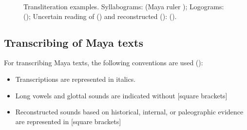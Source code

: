 \documentclass[../main.tex]{subfiles}
\begin{document}
\begin{figure}[ht]
    \centering
    \caption[Transliteration examples]{Transliteration examples.
             Syllabograms: 
            (Maya ruler );
             Logograms: 
             ();
             Uncertain reading of 
             () and reconstructed  (): 
            (\authordrawings).}
\end{figure}

\subsection{Transcribing of Maya texts}
For transcribing Maya texts, the following conventions are used (\cite[14]{kettunenhelmke2020}):
\begin{itemize}
    \item Transcriptions are represented in italics.
    \item Long vowels and glottal sounds are indicated without [square brackets]
    \item Reconstructed sounds based on historical, internal, or paleographic evidence are 
          represented in [square brackets]
\end{itemize}
\end{document}
